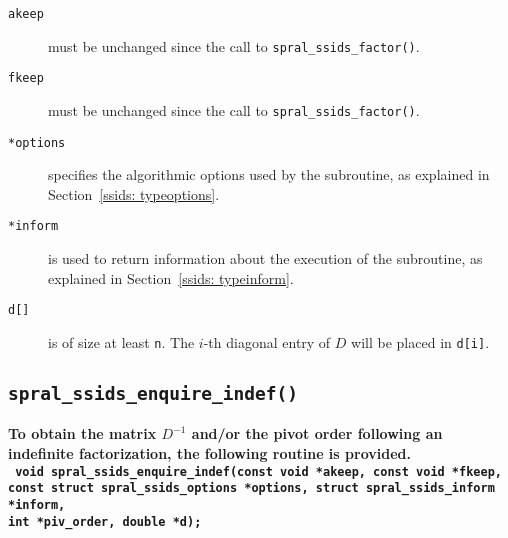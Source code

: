 \begin{description}

\item[\texttt{akeep}] must be unchanged since the call to
   {\tt spral\_ssids\_factor()}.

\item[\texttt{fkeep}] must be unchanged since the call to
   {\tt spral\_ssids\_factor()}.

\item[\texttt{*options}] specifies the algorithmic options used by the
   subroutine, as explained in Section~\ref{ssids: typeoptions}.

\item[\texttt{*inform}] is used to return information about the execution
   of the subroutine, as explained in Section~\ref{ssids: typeinform}.

\item[\texttt{d[]}] is of size at least {\tt n}. The $i$-th diagonal entry of
   $D$ will be placed in {\tt d[i]}.

\end{description}

\subsection{\texttt{spral\_ssids\_enquire\_indef()}}
\textbf{To obtain the matrix $D^{-1}$ and/or the pivot order following an
   indefinite factorization, the following routine is provided.
   \vspace*{0.1cm} \\
   \texttt{
      \hspace*{0.2cm} void spral\_ssids\_enquire\_indef(const void *akeep, const void *fkeep, \\
      \hspace*{0.7cm} const struct spral\_ssids\_options *options,
         struct spral\_ssids\_inform *inform, \\
      \hspace*{0.7cm} int *piv\_order, double *d);
   }
}

